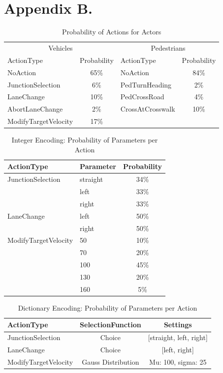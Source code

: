 \chapter{Appendix B.}
\label{chap:appendix_b}
\begin{table}[ht]
	\centering
	\begin{tabular}{lc|lc}
		\hline
		\multicolumn{2}{c|}{Vehicles} & \multicolumn{2}{c}{Pedestrians} \\
		ActionType & Probability & ActionType & Probability \\
		\hline
		NoAction & 65\% & NoAction & 84\% \\
		JunctionSelection & 6\% & PedTurnHeading & 2\% \\
		LaneChange & 10\% & PedCrossRoad & 4\% \\
		AbortLaneChange & 2\% & CrossAtCrosswalk & 10\% \\
		ModifyTargetVelocity & 17\% & & \\
		\hline
	\end{tabular}
	\caption{Probability of Actions for Actors}
	\label{tab:appendix:action_probabilities}
\end{table}


\begin{table}[ht]
	\centering
	\begin{tabular}{llc}
		\hline
		ActionType & Parameter & Probability \\
		\hline
		JunctionSelection 	& straight & 34\% \\
		& left & 33\% \\
		& right & 33\% \\
		\hline
		LaneChange 			& left & 50\% \\
		& right & 50\% \\
		\hline
		ModifyTargetVelocity & 50 & 10\%\\
		& 70 & 20\%\\
		& 100 & 45\%\\
		& 130 & 20\%\\
		& 160 & 5\%\\
		\hline
	\end{tabular}
	\caption{Integer Encoding: Probability of Parameters per Action}
	\label{tab:appendix:integer_encoding_probabilities}
\end{table}


\begin{table}[ht]
	\centering
	\begin{tabular}{lcc}
		\hline
		ActionType & SelectionFunction & Settings \\
		\hline
		JunctionSelection 	& Choice & [straight, left, right] \\
		LaneChange 			& Choice & [left, right]\\
		ModifyTargetVelocity & Gauss Distribution & Mu: 100, sigma: 25\\
		\hline
	\end{tabular}
	\caption{Dictionary Encoding: Probability of Parameters per Action}
	\label{tab:appendix:dict_encoding_probabilities}
\end{table}


